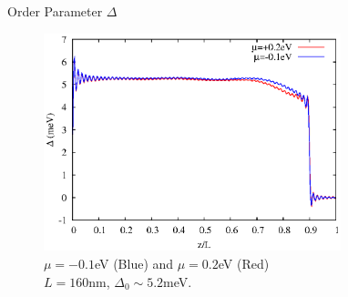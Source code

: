\documentclass[]{beamer}
\begin{document}








\begin{frame}{Order Parameter $\Delta$}
\begin{figure}
\includegraphics[width=3.4in]{include/dtchemi.eps}\\
 $\mu=-0.1$eV (Blue) and $\mu=0.2$eV (Red)\\ 
$L=160$nm,  $\Delta_0\sim 5.2$meV. 
\end{figure}
\end{frame}
\end{document}
